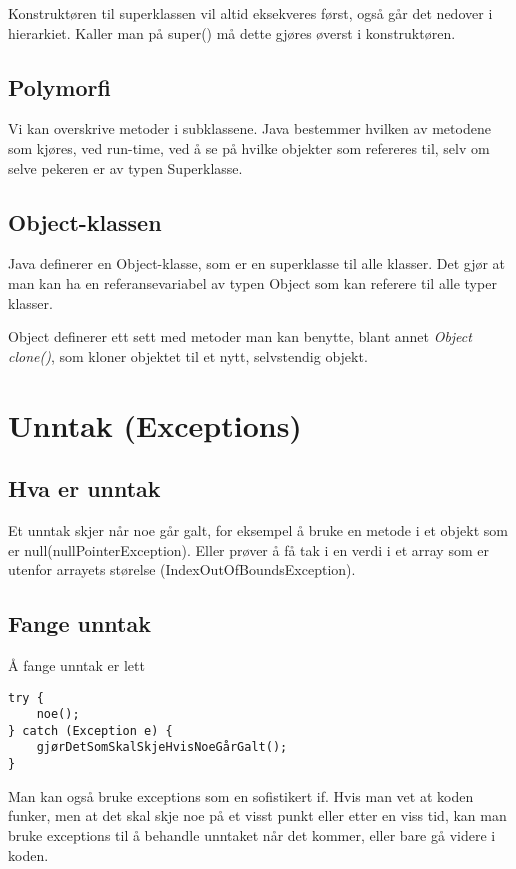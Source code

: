 \documentclass[a4paper,norsk,10pt]{article}
\begin{document}
Konstruktøren til superklassen vil altid eksekveres først, også går
det nedover i hierarkiet. Kaller man på super() må dette gjøres øverst
i konstruktøren.
\subsection{Polymorfi}
\label{sec-18.4}

Vi kan overskrive metoder i subklassene. Java bestemmer hvilken av
metodene som kjøres, ved run-time, ved å se på hvilke objekter som
refereres til, selv om selve pekeren er av typen Superklasse. 
\subsection{Object-klassen}
\label{sec-18.5}

Java definerer en Object-klasse, som er en superklasse til alle
klasser. Det gjør at man kan ha en referansevariabel av typen Object
som kan referere til alle typer klasser.

Object definerer ett sett med metoder man kan benytte, blant annet
\emph{Object clone()}, som kloner objektet til et nytt, selvstendig objekt.
\section{Unntak (Exceptions)}
\label{sec-19}
\subsection{Hva er unntak}
\label{sec-19.1}

Et unntak skjer når noe går galt, for eksempel å bruke en metode i et objekt
som er null(nullPointerException). Eller prøver å få tak i en verdi i et array
som er utenfor arrayets størelse (IndexOutOfBoundsException).
\subsection{Fange unntak}
\label{sec-19.2}

Å fange unntak er lett

\begin{verbatim}
try { 
    noe();
} catch (Exception e) {
    gjørDetSomSkalSkjeHvisNoeGårGalt();
}
\end{verbatim}

Man kan også bruke exceptions som en sofistikert if. Hvis man vet at koden funker, men at det
skal skje noe på et visst punkt eller etter en viss tid, kan man bruke exceptions til å
behandle unntaket når det kommer, eller bare gå videre i koden.
\end{document}
